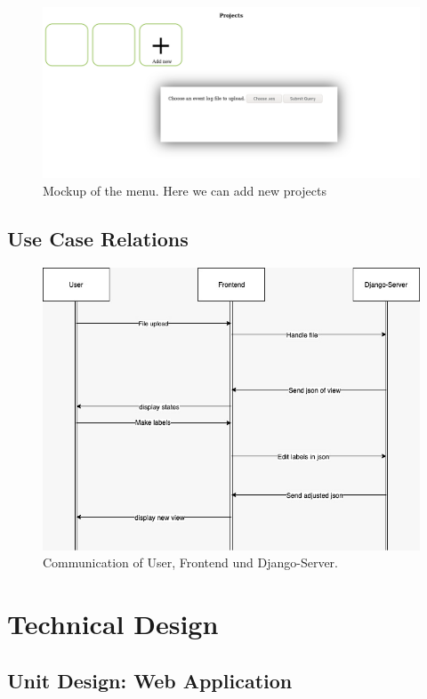 \documentclass[12pt]{extarticle}
\begin{document}
\begin{figure}[H]
    \centering
    \includegraphics[width=\textwidth]{dummy.png}
    \caption{Mockup of the menu. Here we can add new projects}
    \label{fig:my_label}
\end{figure}

\subsection{Use Case Relations}

\begin{figure}[H]
    \centering
    \includegraphics[width=\textwidth]{img1.jpeg}
    \caption{Communication of User, Frontend und Django-Server.}
    \label{fig:arc_1}
\end{figure}


\section{Technical Design}

\subsection{Unit Design: Web Application}
\end{document}
